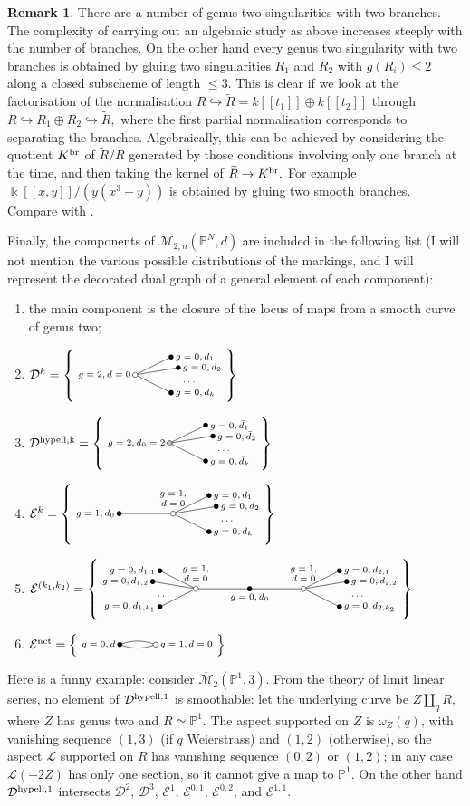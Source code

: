 \documentclass[11pt]{amsart}
\def\Dk{\tikz[baseline=-3pt]{
\draw (0,0)node[left]{\scriptsize $g=2,d=0$} -- (1,.5) node[right]{\scriptsize $g=0,d_1$} (0,0)--(1,-.5)node[right]{\scriptsize $g=0,d_k$} (0,0) -- (1.2,.2)node[right]{\scriptsize $g=0,d_2$};
\draw (1.2,-.2) node[right]{\scriptsize $\ldots$};
\draw (0,0) circle(2pt)[fill=white];
\fill (1,.5) circle (2pt) (1,-.5) circle (2pt) (1.2,.2) circle (2pt)}
}
\def\Ek{\tikz[baseline=-3pt]{
\draw (-1.5,0) node[left]{\scriptsize $g=1,d_0$} -- (0,0);
\draw (0,0)node[above]{\scriptsize \begin{tabular}{c} $g=1,$ \\ $d=0$ \end{tabular}} -- (1,.5) node[right]{\scriptsize $g=0,d_1$} (0,0)--(1,-.5)node[right]{\scriptsize $g=0,d_k$} (0,0) -- (1.2,.2)node[right]{\scriptsize $g=0,d_2$};
\draw (1.2,-.2) node[right]{\scriptsize $\ldots$};
\draw (0,0) circle(2pt)[fill=white];
\fill (-1.5,0) circle (2pt) (1,.5) circle (2pt) (1,-.5) circle (2pt) (1.2,.2) circle (2pt)}
}
\def\Ekk{\tikz[baseline=-3pt]{
\draw (-3,0)node[above]{\scriptsize \begin{tabular}{c} $g=1,$ \\ $d=0$ \end{tabular}} -- (-4,.5) node[left]{\scriptsize $g=0,d_{1,1}$} (-3,0)--(-4,-.5)node[left]{\scriptsize $g=0,d_{1,k_1}$} (-3,0) -- (-4.2,.2)node[left]{\scriptsize $g=0,d_{1,2}$};
\draw (-3,0) -- (-1.5,0) node[below]{\scriptsize $g=0,d_0$} -- (0,0);
\draw (0,0)node[above]{\scriptsize \begin{tabular}{c} $g=1,$ \\ $d=0$ \end{tabular}} -- (1,.5) node[right]{\scriptsize $g=0,d_{2,1}$} (0,0)--(1,-.5)node[right]{\scriptsize $g=0,d_{2,k_2}$} (0,0) -- (1.2,.2)node[right]{\scriptsize $g=0,d_{2,2}$};
\draw (1.2,-.2) node[right]{\scriptsize $\ldots$} (-4.2,-.2) node[right]{\scriptsize $\ldots$};
\draw (0,0) circle(2pt)[fill=white] (-3,0) circle(2pt)[fill=white];
\fill (-1.5,0) circle (2pt) (1,.5) circle (2pt) (1,-.5) circle (2pt) (1.2,.2) circle (2pt) (-4,.5) circle (2pt) (-4,-.5) circle (2pt) (-4.2,.2) circle (2pt)}
}
\def\pacman{\tikz[baseline=-3pt]{
\draw (0,0)node[left]{\scriptsize $g=0,d$} to[out=20,in=160] (1,0) node[right]{\scriptsize $g=1,d=0$};
\draw (0,0) to[out=-20,in=-160] (1,0);
\fill (0,0) circle (2pt);
\draw[fill=white] (1,0) circle (2pt)}
}
\def\hypell{\tikz[baseline=-3pt]{
\draw (0,0)node[left]{\scriptsize $g=2,d_0=2$} -- (1,.5) node[right]{\scriptsize $g=0,\bar d_1$} (0,0)--(1,-.5)node[right]{\scriptsize $g=0,\bar d_k$} (0,0) -- (1.2,.2)node[right]{\scriptsize $g=0,\bar d_2$};
\draw (1.2,-.2) node[right]{\scriptsize $\ldots$};
\draw (0,0) circle(2pt)[fill=gray!50];
\fill (1,.5) circle (2pt) (1,-.5) circle (2pt) (1.2,.2) circle (2pt)}
}
\newcommand{\oM}{\overline{\mathcal{M}}}
\newcommand{\M}[4]{\overline{\mathcal{M}}_{#1,#2}(#3,#4)}
\newcommand{\PP}{\mathbb P}
\renewcommand{\to}{\rightarrow}
\newcommand{\kk}{\Bbbk}
\theoremstyle{definition}
\theoremstyle{definition}
\newtheorem{rmk}[thm]{Remark}
\begin{document}
\begin{rmk}
 There are a number of genus two singularities with two branches. The complexity of carrying out an algebraic study as above increases steeply with the number of branches. On the other hand every genus two singularity with two branches is obtained by gluing two singularities $R_1$ and $R_2$ with $g(R_i)\leq 2$ along a closed subscheme of length $\leq 3$.
 This is clear if we look at the factorisation of the normalisation $R\hookrightarrow \widetilde{R}=k[\![t_1]\!]\oplus k[\![t_2]\!]$ through $R\hookrightarrow R_1\oplus R_2\hookrightarrow \widetilde{R},$ where 
 the first partial normalisation corresponds to separating the branches. Algebraically, this can be achieved by considering the quotient $K^{\rm{br}}$ of $\widetilde{R}/R$ generated by those conditions involving only one branch at the time, and then taking the kernel of $\widetilde{R}\to K^{\rm{br}}.$ For example $\kk[\![x,y]\!]/(y(x^3-y))$ is obtained by gluing two smooth branches. Compare with \cite[Appendix A]{SMYtowards}.
\end{rmk}

Finally, the components of $\M{2}{n}{\PP^N}{d}$ are included in the following list (I will not mention the various possible distributions of the markings, and I will represent the decorated dual graph of a general element of each component):
\begin{enumerate}
 \item the main component is the closure of the locus of maps from a smooth curve of genus two;
 \item $\mathcal D^k=\left\{\Dk\right\}$
  \item $\mathcal D^{\rm{hypell},k}=\left\{\hypell\right\}$
 \item $\mathcal E^k=\left\{\Ek\right\}$
 \item $\mathcal E^{(k_1,k_2)}=\left\{\Ekk\right\}$
 \item $\mathcal E^{\rm{nct}}=\left\{\pacman\right\}$
\end{enumerate}
Here is a funny example: consider $\oM_2(\PP^1,3)$. From the theory of limit linear series, no element of $\mathcal D^{\rm{hypell},1}$ is smoothable: let the underlying curve be $Z\coprod_q R$, where $Z$ has genus two and $R\simeq\PP^1$. The aspect supported on $Z$ is $\omega_Z(q)$, with vanishing sequence $(1,3)$ (if $q$ Weierstrass) and $(1,2)$ (otherwise), so the aspect $\mathcal L$ supported on $R$ has vanishing sequence $(0,2)$ or $(1,2)$; in any case $\mathcal L(-2Z)$ has only one section, so it cannot give a map to $\PP^1$. On the other hand $\mathcal D^{\rm{hypell},1}$ intersects $\mathcal D^2$, $\mathcal D^3$, $\mathcal E^1$, $\mathcal E^{0,1}$, $\mathcal E^{0,2}$, and $\mathcal E^{1,1}$. 
\end{document}
